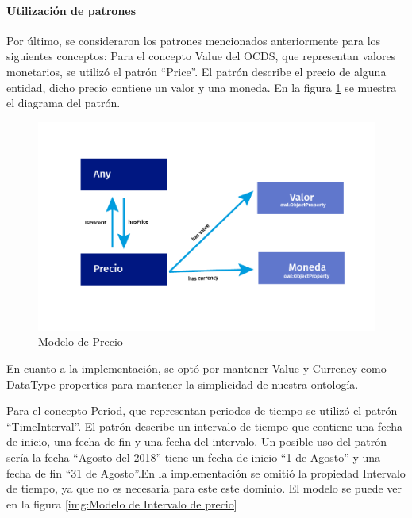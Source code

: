 \paragraph{Utilización de patrones}
Por último, se consideraron los patrones mencionados anteriormente para los siguientes conceptos:
Para el concepto Value del OCDS, que representan valores monetarios, se utilizó el patrón “Price”. El patrón describe el precio de alguna entidad, dicho precio contiene un valor y una moneda. En la figura \ref{img:Modelo de Precio} se muestra el diagrama del patrón.

\begin{figure}[ht!]
    \centering
    \includegraphics[width=150mm]{figuras/Diagramas_Precio.png}
    \caption{Modelo de Precio}
    \label{img:Modelo de Precio}
    
\end{figure}

En cuanto a la implementación, se optó por mantener Value y Currency como DataType properties para mantener la simplicidad de nuestra ontología.

Para el concepto Period, que representan periodos de tiempo se utilizó el patrón “TimeInterval”. El patrón describe un intervalo de tiempo que contiene una fecha de inicio, una fecha de fin y una fecha del intervalo. Un posible uso del patrón sería la fecha “Agosto del 2018” tiene un fecha de inicio “1 de Agosto” y una fecha de fin “31 de Agosto”.En la implementación se omitió la propiedad Intervalo de tiempo, ya que no es necesaria para este este dominio. El modelo se puede ver en la figura \ref{img:Modelo de Intervalo de precio}

